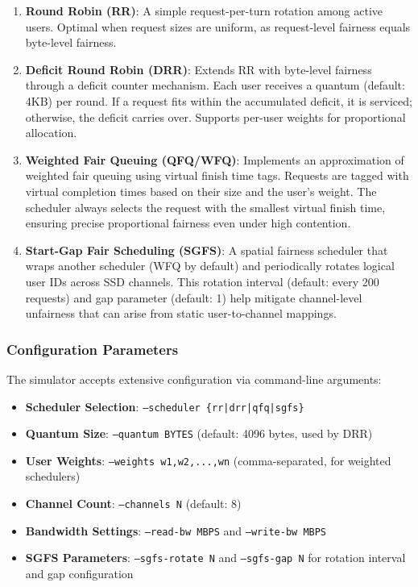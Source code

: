 \documentclass[11pt]{article}
\begin{document}
\begin{enumerate}
    \item \textbf{Round Robin (RR)}: A simple request-per-turn rotation among active users. Optimal when request sizes are uniform, as request-level fairness equals byte-level fairness.
    
    \item \textbf{Deficit Round Robin (DRR)}: Extends RR with byte-level fairness through a deficit counter mechanism. Each user receives a quantum (default: 4KB) per round. If a request fits within the accumulated deficit, it is serviced; otherwise, the deficit carries over. Supports per-user weights for proportional allocation.
    
    \item \textbf{Weighted Fair Queuing (QFQ/WFQ)}: Implements an approximation of weighted fair queuing using virtual finish time tags. Requests are tagged with virtual completion times based on their size and the user's weight. The scheduler always selects the request with the smallest virtual finish time, ensuring precise proportional fairness even under high contention.
    
    \item \textbf{Start-Gap Fair Scheduling (SGFS)}: A spatial fairness scheduler that wraps another scheduler (WFQ by default) and periodically rotates logical user IDs across SSD channels. This rotation interval (default: every 200 requests) and gap parameter (default: 1) help mitigate channel-level unfairness that can arise from static user-to-channel mappings.
\end{enumerate}

\subsubsection{Configuration Parameters}

The simulator accepts extensive configuration via command-line arguments:

\begin{itemize}
    \item \textbf{Scheduler Selection}: \texttt{--scheduler \{rr|drr|qfq|sgfs\}}
    \item \textbf{Quantum Size}: \texttt{--quantum BYTES} (default: 4096 bytes, used by DRR)
    \item \textbf{User Weights}: \texttt{--weights w1,w2,...,wn} (comma-separated, for weighted schedulers)
    \item \textbf{Channel Count}: \texttt{--channels N} (default: 8)
    \item \textbf{Bandwidth Settings}: \texttt{--read-bw MBPS} and \texttt{--write-bw MBPS}
    \item \textbf{SGFS Parameters}: \texttt{--sgfs-rotate N} and \texttt{--sgfs-gap N} for rotation interval and gap configuration
\end{itemize}
\end{document}

